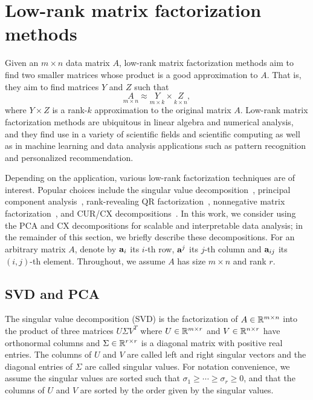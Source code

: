 \section{Low-rank matrix factorization methods}
\label{sxn:low-rank-methods}

Given an $m \times n$ data matrix $A$, low-rank matrix factorization methods
aim to find two smaller matrices whose product is a good approximation to $A$.
That is, they aim to find matrices $Y$ and $Z$ such that
\begin{equation}
 \label{eqn:apprx}
    \underset{m\times n}{A} \approx \underset{m\times k}{Y} \times \underset{k\times n}{Z} , 
\end{equation}
where $Y \times Z$ is a rank-$k$ approximation to the original matrix $A$.
Low-rank matrix factorization methods are ubiquitous in linear algebra
and numerical analysis, and they find use in a variety of scientific fields and
scientific computing as well as in machine learning and data analysis
applications such as pattern recognition and personalized recommendation.

Depending on the application, various low-rank factorization techniques are of
interest.  Popular choices include the singular value
decomposition~\cite{GVL96}, principal component analysis~\cite{pcaBook},
rank-revealing QR factorization~\cite{GE96}, nonnegative matrix
factorization~\cite{NMFalg}, and CUR/CX decompositions~\cite{CUR_PNAS}.  In
this work, we consider using the PCA and CX decompositions for scalable and
interpretable data analysis; in the remainder of this section, we briefly
describe these decompositions.
For an arbitrary matrix $A$, denote by $\mathbf{a}_i$
its $i$-th row, $\mathbf{a}^j$ its $j$-th column and $\mathbf{a}_{ij}$ its $(i,j)$-th element.
Throughout, we assume $A$ has size $m \times n$ and rank $r$.


\subsection{SVD and PCA}

The singular value decomposition (SVD) is the factorization of $A \in
\mathbb{R}^{m\times n}$ into the product of three matrices $U\Sigma V^T$ where $U
\in \mathbb{R}^{m\times r}$ and $V\in \mathbb{R}^{n\times r}$ have orthonormal columns
and $\Sigma\in \mathbb{R}^{r\times r}$ is a diagonal matrix with positive real
entries. The columns of $U$ and $V$ are called left and right singular vectors
and the diagonal entries of $\Sigma$ are called singular values.  For notation
convenience, we assume the singular values are sorted such that $\sigma_1\geq
\cdots \geq \sigma_r\geq 0$, and that the columns of $U$ and $V$ are
sorted by the order given by the singular values.  
 
